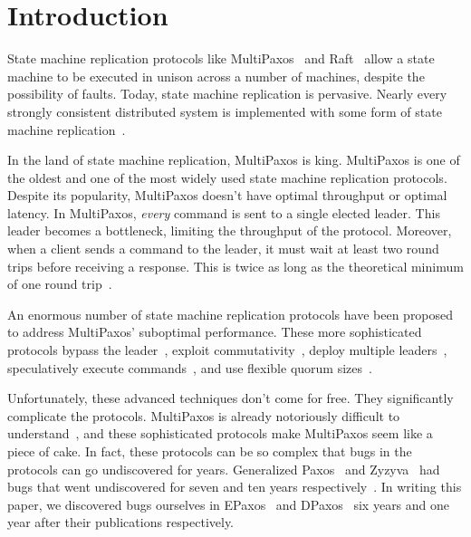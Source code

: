 
\section{Introduction}
State machine replication protocols like MultiPaxos~\cite{lamport1998part,
lamport2001paxos} and Raft~\cite{ongaro2014search} allow a state machine to be
executed in unison across a number of machines, despite the possibility of
faults. Today, state machine replication is pervasive. Nearly every strongly
consistent distributed system is implemented with some form of state machine
replication~\cite{corbett2013spanner, thomson2012calvin, hunt2010zookeeper,
burrows2006chubby, baker2011megastore}.
%

In the land of state machine replication, MultiPaxos is king. MultiPaxos is one
of the oldest and one of the most widely used state machine replication
protocols. Despite its popularity, MultiPaxos doesn't have optimal throughput
or optimal latency. In MultiPaxos, \emph{every} command is sent to a single
elected leader. This leader becomes a bottleneck, limiting the throughput of
the protocol. Moreover, when a client sends a command to the leader, it must
wait at least two round trips before receiving a response. This is twice as
long as the theoretical minimum of one round trip~\cite{lamport2006lower}.

An enormous number of state machine replication protocols have been proposed to
address MultiPaxos' suboptimal performance. These more sophisticated protocols
%
bypass the leader~\cite{lamport2006fast, ports2015designing, li2016just},
%
exploit commutativity~\cite{lamport2005generalized, moraru2013there,
arun2017speeding, park2019exploiting},
%
deploy multiple leaders~\cite{mao2008mencius, moraru2013there,
arun2017speeding},
%
speculatively execute commands~\cite{ports2015designing, li2016just,
park2019exploiting},
%
and use flexible quorum sizes~\cite{howard2016flexible, nawab2018dpaxos}.

Unfortunately, these advanced techniques don't come for free. They
significantly complicate the protocols. MultiPaxos is already notoriously
difficult to understand~\cite{van2015paxos, ongaro2014search}, and these
sophisticated protocols make MultiPaxos seem like a piece of cake. In fact,
these protocols can be so complex that bugs in the protocols can go
undiscovered for years. Generalized Paxos~\cite{lamport2005generalized} and
Zyzyva~\cite{kotla2007zyzzyva} had bugs that went undiscovered for seven and
ten years respectively~\cite{sutra2011fast, abraham2017revisiting}. In writing
this paper, we discovered bugs ourselves in EPaxos~\cite{moraru2013there} and
DPaxos~\cite{nawab2018dpaxos} six years and one year after their publications
respectively.
%

